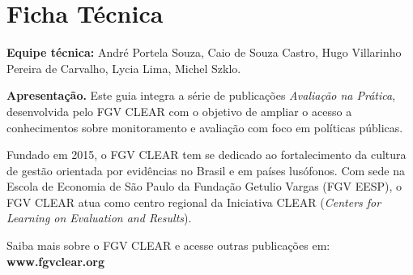 
\thispagestyle{empty}
\section*{Ficha Técnica}

\textbf{Equipe técnica:} André Portela Souza, Caio de Souza Castro, Hugo Villarinho Pereira de Carvalho, Lycia Lima, Michel Szklo.

\vspace{1cm}

\noindent\textbf{Apresentação.} Este guia integra a série de publicações
\textit{Avaliação na Prática}, desenvolvida pelo FGV CLEAR com o objetivo de
ampliar o acesso a conhecimentos sobre monitoramento e avaliação com foco em
políticas públicas.

Fundado em 2015, o FGV CLEAR tem se dedicado ao fortalecimento da cultura de
gestão orientada por evidências no Brasil e em países lusófonos. Com sede na
Escola de Economia de São Paulo da Fundação Getulio Vargas (FGV EESP), o FGV
CLEAR atua como centro regional da Iniciativa CLEAR (\textit{Centers for
Learning on Evaluation and Results}).

Saiba mais sobre o FGV CLEAR e acesse outras publicações em:
\textbf{www.fgvclear.org}

\newpage